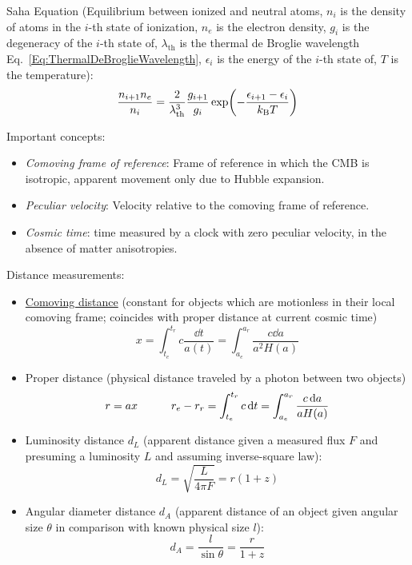 			\noindent
			Saha Equation (Equilibrium between ionized and neutral atoms, $n_i$ is the density of atoms in the $i$-th state of ionization, $n_e$ is the electron density, $g_i$ is the degeneracy of the $i$-th state of, $\lambda_\text{th}$ is the thermal de Broglie wavelength Eq.~\ref{Eq:ThermalDeBroglieWavelength}, $\epsilon_i$ is the energy of the $i$-th state of, $T$ is the temperature):
			\begin{equation}
				\frac{n_{i+1} n_e}{n_i} = \frac{2}{\lambda_\text{th}^3} \frac{g_{i+1}}{g_i} \exp(- \frac{\epsilon_{i+1}-\epsilon_{i}}{k_{\text{B}} T})
			\end{equation}


			\noindent
			Important concepts:
			\begin{itemize}
				\item \emph{Comoving frame of reference}: Frame of reference in which the CMB is isotropic, apparent movement only due to Hubble expansion.
				\item \emph{Peculiar velocity}: Velocity relative to the comoving frame of reference.
				\item \emph{Cosmic time}: time measured by a clock with zero peculiar velocity, in the absence of matter anisotropies.
			\end{itemize}

			\noindent
			Distance measurements:
			\begin{itemize}
				\item \href{https://en.wikipedia.org/wiki/Comoving_and_proper_distances}{Comoving distance} (constant for objects which are motionless in their local comoving frame; coincides with proper distance at current cosmic time)
					\begin{equation}
						x = \int_{t_e}^{t_r} c\frac{\dd t}{a(t)}
						= \int_{a_e}^{a_r} \frac{c \dd a}{a^2 H(a)}
					\end{equation}
				\item Proper distance (physical distance traveled by a photon between two objects)
					\begin{equation}
						r = a x
						\hspace{30pt}
						r_e - r_r = \int_{t_e}^{t_r} c \,\dd t
						= \int_{a_e}^{a_r} \frac{c\, \dd a}{a H(a)}
					\end{equation}
				\item Luminosity distance $d_L$ (apparent distance given a measured flux $F$ and presuming a luminosity $L$ and assuming inverse-square law):
					\begin{equation}
						d_L = \sqrt{\frac{L}{4 \pi F}} = r (1+z)
					\end{equation}
				\item Angular diameter distance $d_A$ (apparent distance of an object given angular size $\theta$ in comparison with known physical size $l$):
					\begin{equation}
						d_A = \frac{l}{\sin \theta} = \frac{r}{1+z}
					\end{equation}
			\end{itemize}


